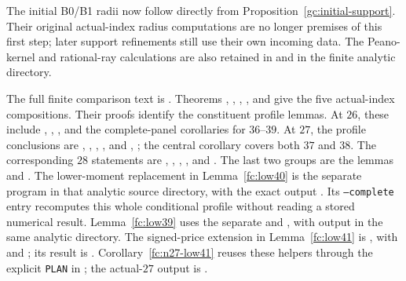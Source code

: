\documentclass[aop,preprint]{imsart}
\theoremstyle{definition}
\numberwithin{equation}{section}
\begin{document}
The initial B0/B1 radii now follow directly from
Proposition~\ref{gc:initial-support}. Their original actual-index
radius computations are no longer premises of this first step;
later support refinements still use their own incoming data.
The Peano-kernel and rational-ray calculations are also retained in
 and
 in the finite analytic directory.

The full finite comparison text is
.
Theorems , ,
, , and
 give the five actual-index compositions.
Their proofs identify the constituent profile lemmas.
At $26$, these include ,
,
, and the complete-panel
corollaries for $36$--$39$.
At $27$, the profile conclusions are
, ,
, , and
, ;
the central corollary covers both $37$ and $38$.
The corresponding $28$ statements are
, ,
, , and
.
The last two groups are the lemmas
 and
.
The lower-moment replacement in Lemma~\ref{fc:low40} is the
separate program 
in that analytic source directory, with the exact output
.
Its \texttt{--complete} entry recomputes this whole conditional
profile without reading a stored numerical result.
Lemma~\ref{fc:low39} uses the separate
 and
, with output
 in the
same analytic directory.
The signed-price extension in Lemma~\ref{fc:low41} is
, with
 and
; its result is
.
Corollary~\ref{fc:n27-low41} reuses these helpers through the
explicit \texttt{PLAN} in
; the actual-$27$ output is
.
\end{document}
